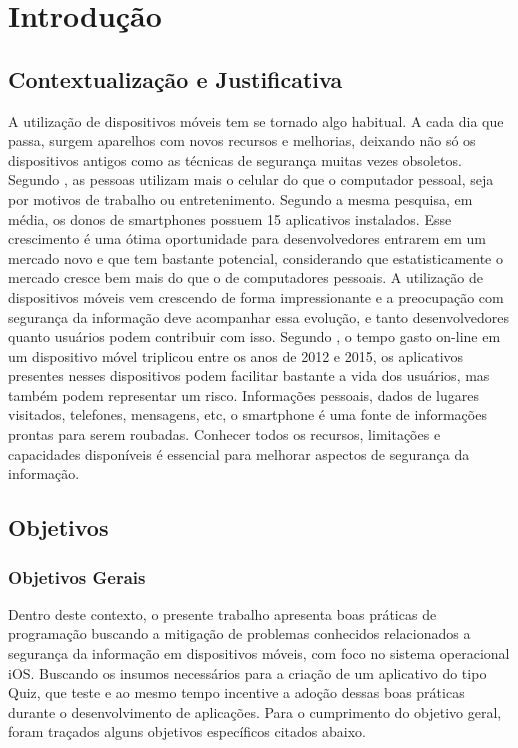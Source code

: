 \section{Introdução}
\subsection{Contextualização e Justificativa}
A utilização de dispositivos móveis tem se tornado algo habitual. A cada dia que passa, surgem aparelhos com novos recursos e melhorias, deixando não só os dispositivos antigos como as técnicas de segurança muitas vezes obsoletos. Segundo \cite{FAST}, as pessoas utilizam mais o celular do que o computador pessoal, seja por motivos de trabalho ou entretenimento. Segundo a mesma pesquisa, em média, os donos de smartphones possuem 15 aplicativos instalados. Esse crescimento é uma ótima oportunidade para desenvolvedores entrarem em um mercado novo e que tem bastante potencial, considerando que estatisticamente o mercado cresce bem mais do que o de computadores pessoais. A utilização de dispositivos móveis vem crescendo de forma impressionante e a preocupação com segurança da informação deve acompanhar essa evolução, e tanto desenvolvedores quanto usuários podem contribuir com isso. Segundo \cite{FAST}, o tempo gasto on-line em um dispositivo móvel triplicou entre os anos de 2012 e 2015, os aplicativos presentes nesses dispositivos podem facilitar bastante a vida dos usuários, mas também podem representar um risco. Informações pessoais, dados de lugares visitados, telefones, mensagens, etc, o smartphone é uma fonte de informações prontas para serem roubadas. Conhecer todos os recursos, limitações e capacidades disponíveis é essencial para melhorar aspectos de segurança da informação. 

\subsection{Objetivos}
\subsubsection{Objetivos Gerais}
Dentro deste contexto, o presente trabalho apresenta boas práticas de programação buscando a mitigação de problemas conhecidos relacionados a segurança da informação em dispositivos móveis, com foco no sistema operacional iOS. Buscando os insumos necessários para a criação de um aplicativo do tipo Quiz, que teste e ao mesmo tempo incentive a adoção dessas boas práticas durante o desenvolvimento de aplicações. Para o cumprimento do objetivo geral, foram traçados alguns objetivos específicos citados abaixo.

